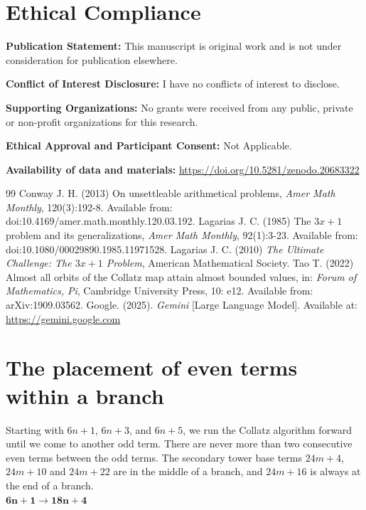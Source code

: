 \documentclass[sn-mathphys-num, pdflatex]{sn-jnl}
\begin{document}
\section*{Ethical Compliance}
\noindent \textbf{Publication Statement:} This manuscript is original work and is not under consideration for publication elsewhere. 

\noindent \textbf{Conflict of Interest Disclosure:} I have no conflicts of interest to disclose.   

\noindent \textbf{Supporting Organizations:} No grants were received from any public, private or non-profit organizations for this research. 

\noindent \textbf{Ethical Approval and Participant Consent:} Not Applicable. 

\noindent \textbf{Availability of data and materials:} \url{https://doi.org/10.5281/zenodo.20683322}

\begin{thebibliography}{99}
     Conway J. H. (2013) On unsettleable arithmetical problems, \emph{Amer Math Monthly}, 120(3):192-8. Available from: doi:10.4169/amer.math.monthly.120.03.192.
     Lagarias J. C. (1985) The $3x + 1$ problem and its generalizations, \emph{Amer Math Monthly}, 92(1):3-23. Available from: doi:10.1080/00029890.1985.11971528.
     Lagarias J. C. (2010) \emph{The Ultimate Challenge: The $3x + 1$ Problem}, American Mathematical Society.
     Tao T. (2022) Almost all orbits of the Collatz map attain almost bounded values, in: \emph{Forum of Mathematics, Pi}, Cambridge University Press, 10: e12. Available from: arXiv:1909.03562.
     Google. (2025). \textit{Gemini} [Large Language Model]. Available at: \url{https://gemini.google.com}
\end{thebibliography}

\appendix
\section{The placement of even terms within a branch}\label{app1}
Starting with $6n+1$, $6n+3$, and $6n+5$, we run the Collatz algorithm forward until we come to another odd term. There are never more than two consecutive even terms between the odd terms. The secondary tower base terms $24m+4$, $24m+10$ and $24m+22$ are in the middle of a branch, and $24m+16$ is always at the end of a branch. \\

$\boldsymbol{6n+1} \to \boldsymbol{18n+4}$ 
\end{document}
